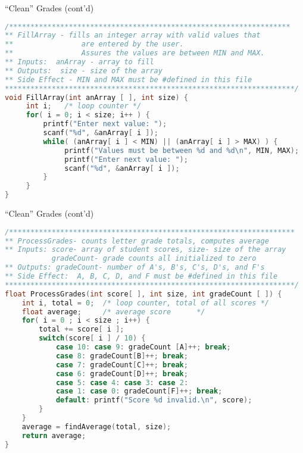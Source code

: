 \documentclass[graphics]{beamer}
\begin{document}
\begin{frame}[fragile]{``Clean'' Grades (cont'd)}
    \begin{lstlisting}[language=C,basicstyle=\scriptsize,keywordstyle=\color{blue},commentstyle=\color{green},showstringspaces=false,stringstyle=\color{red}]
/******************************************************************
** FillArray - fills an integer array with valid values that
**                are entered by the user.  
**                Assures the values are between MIN and MAX.
** Inputs:  anArray - array to fill
** Outputs:  size - size of the array
** Side Effect - MIN and MAX must be #defined in this file
********************************************************************/
void FillArray(int anArray [ ], int size) {
     int i;   /* loop counter */
     for( i = 0; i < size; i++ ) {
         printf("Enter next value: ");
         scanf("%d", &anArray[ i ]);
         while( (anArray[ i ] < MIN) || (anArray[ i ] > MAX) ) {
              printf("Values must be between %d and %d\n", MIN, MAX);
              printf("Enter next value: ");
              scanf("%d", &anArray[ i ]);
         }
     }
}
    \end{lstlisting}
\end{frame}

\begin{frame}[fragile]{``Clean'' Grades (cont'd)}
    \begin{lstlisting}[language=C,basicstyle=\scriptsize,keywordstyle=\color{blue},commentstyle=\color{green},showstringspaces=false,stringstyle=\color{red}]
/*******************************************************************
** ProcessGrades- counts letter grade totals, computes average
** Inputs: score- array of student scores, size- size of the array
           gradeCount- grade counts all initialized to zero
** Outputs: gradeCount- number of A's, B's, C's, D's, and F's
** Side Effect:  A, B, C, D, and F must be #defined in this file
********************************************************************/
float ProcessGrades(int score[ ], int size, int gradeCount [ ]) {
    int i, total = 0;  /* loop counter, total of all scores */
    float average;     /* average score      */
    for( i = 0 ; i < size ; i++) {
        total += score[ i ];
        switch(score[ i ] / 10) {
            case 10: case 9: gradeCount [A]++; break;
            case 8: gradeCount[B]++; break;
            case 7: gradeCount[C]++; break;
            case 6: gradeCount[D]++; break;
            case 5: case 4: case 3: case 2:
            case 1: case 0: gradeCount[F]++; break;
            default: printf("Score %d invalid.\n", score);
        }
    }
    average = findAverage(total, size);
    return average;
}
    \end{lstlisting}
\end{frame}
\end{document}
